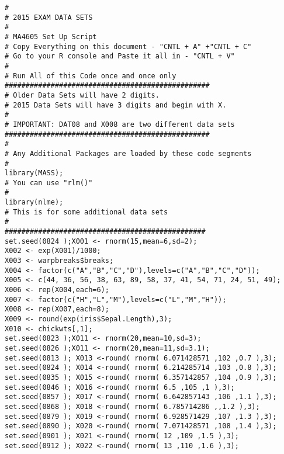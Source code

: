 \documentclass[]{article}
\begin{document}
\begin{verbatim}
#
# 2015 EXAM DATA SETS
#
# MA4605 Set Up Script
# Copy Everything on this document - "CNTL + A" +"CNTL + C"
# Go to your R console and Paste it all in - "CNTL + V"
#
# Run All of this Code once and once only
#################################################
# Older Data Sets will have 2 digits.
# 2015 Data Sets will have 3 digits and begin with X.
#
# IMPORTANT: DAT08 and X008 are two different data sets
#################################################
#
# Any Additional Packages are loaded by these code segments
#
library(MASS);
# You can use "rlm()"
#
library(nlme);
# This is for some additional data sets
#
################################################
set.seed(0824 );X001 <- rnorm(15,mean=6,sd=2);
X002 <- exp(X001)/1000;
X003 <- warpbreaks$breaks;
X004 <- factor(c("A","B","C","D"),levels=c("A","B","C","D"));
X005 <- c(44, 36, 56, 38, 63, 89, 58, 37, 41, 54, 71, 24, 51, 49);
X006 <- rep(X004,each=6);
X007 <- factor(c("H","L","M"),levels=c("L","M","H"));
X008 <- rep(X007,each=8);
X009 <- round(exp(iris$Sepal.Length),3);
X010 <- chickwts[,1];
set.seed(0823 );X011 <- rnorm(20,mean=10,sd=3);
set.seed(0826 );X011 <- rnorm(20,mean=11,sd=3.1);
set.seed(0813 ); X013 <-round( rnorm( 6.071428571 ,102 ,0.7 ),3);
set.seed(0824 ); X014 <-round( rnorm( 6.214285714 ,103 ,0.8 ),3);
set.seed(0835 ); X015 <-round( rnorm( 6.357142857 ,104 ,0.9 ),3);
set.seed(0846 ); X016 <-round( rnorm( 6.5 ,105 ,1 ),3);
set.seed(0857 ); X017 <-round( rnorm( 6.642857143 ,106 ,1.1 ),3);
set.seed(0868 ); X018 <-round( rnorm( 6.785714286 ,,1.2 ),3);
set.seed(0879 ); X019 <-round( rnorm( 6.928571429 ,107 ,1.3 ),3);
set.seed(0890 ); X020 <-round( rnorm( 7.071428571 ,108 ,1.4 ),3);
set.seed(0901 ); X021 <-round( rnorm( 12 ,109 ,1.5 ),3);
set.seed(0912 ); X022 <-round( rnorm( 13 ,110 ,1.6 ),3);


\end{verbatim}
\end{document}
